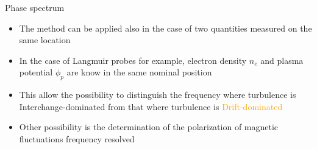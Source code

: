 \documentclass[t,10pt]{beamer}
\begin{document}
\begin{frame}{Phase spectrum}
\begin{itemize}[<+->]
\item The method can be applied also in the case of two quantities
  measured on the same location
\item In the case of Langmuir probes for example, electron density
  $n_e$ and plasma potential $\phi_p$ are know in the same nominal
  position


\item This allow the possibility to distinguish the frequency where
  turbulence is \textcolor{rfxcyan}{Interchange-dominated} from that
  where turbulence is \textcolor{orange}{Drift-dominated}
\item Other possibility is the determination of the polarization of
  magnetic fluctuations frequency resolved 
\end{itemize}
\end{frame}
\end{document}
